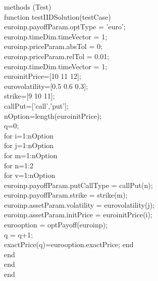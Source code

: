 \documentclass[]{elsarticle}
\theoremstyle{definition}
\theoremstyle{remark}
\begin{document}
    
      methods (Test)\\
          function testIIDSolution(testCase)\\
              euroinp.payoffParam.optType = {'euro'};\\
              euroinp.timeDim.timeVector = 1;\\
              euroinp.priceParam.absTol = 0;\\
              euroinp.priceParam.relTol = 0.01;\\
              euroinp.timeDim.timeVector = 1;\\
              euroinitPrice=[10 11 12];\\
              eurovolatility=[0.5 0.6 0.3];\\
              strike=[9 10 11];\\
              callPut=[{'call'},{'put'}];\\
              nOption=length(euroinitPrice);\\
              q=0;\\
              for i=1:nOption\\
                  for j=1:nOption\\
                      for m=1:nOption\\
                          for n=1:2\\
                              for v=1:nOption\\
                              euroinp.payoffParam.putCallType = callPut(n);\\
                              euroinp.payoffParam.strike = strike(m);\\
                              euroinp.assetParam.volatility = eurovolatility(j);\\
                              euroinp.assetParam.initPrice = euroinitPrice(i);\\
                              eurooption = optPayoff(euroinp);\\
                              q = q+1;\\
                              exactPrice(q)=eurooption.exactPrice;
                              end\\
                          end\\
                      end\\
                  end\\
\end{document}
